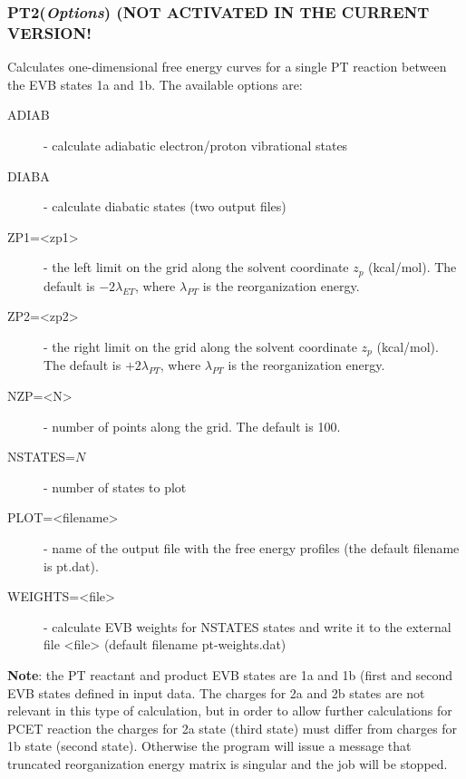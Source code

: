 \documentclass[oneside,11pt,openany]{book}
\newcommand{\tw}{\ttfamily}
\begin{document}
\subsubsection*{PT2({\it Options}) ({\bf NOT ACTIVATED IN THE CURRENT VERSION!}}
%
Calculates one-dimensional free energy curves for a single PT reaction
between the EVB states 1a and 1b. The available options are:
\begin{description}

\item[{\tw ADIAB}] - calculate adiabatic electron/proton vibrational
                     states

\item[{\tw DIABA}] - calculate diabatic states (two output files)

\item[{\tw ZP1=<zp1>}] - the left limit on the grid along the solvent
            coordinate $z_p$ (kcal/mol). The default is
            $-2\lambda_{ET}$, where $\lambda_{PT}$ is the
            reorganization energy.

\item[{\tw ZP2=<zp2>}] - the right limit on the grid along the solvent
            coordinate $z_p$ (kcal/mol). The default is
            $+2\lambda_{PT}$, where $\lambda_{PT}$ is the
            reorganization energy.

\item[{\tw NZP=<N>}] - number of points along the grid. The default is 100.

\item[{\tw NSTATES=$N$}] - number of states to plot

\item[{\tw PLOT=<filename>}] - name of the output file with the free energy
                  profiles (the default filename is {\tw pt.dat}).

\item[{\tw WEIGHTS=<file>}] - calculate EVB weights for {\tw NSTATES} states
                              and write it to the external file {\tw <file>}
                              (default filename {\tw pt-weights.dat})

\end{description}

{\bf Note}: the PT reactant and product EVB states are 1a and 1b
(first and second EVB states defined in input data. The charges for
2a and 2b states are not relevant in this type of calculation,
but in order to allow further calculations for PCET reaction
the charges for 2a state (third state) must differ from charges
for 1b state (second state). Otherwise the program will issue
a message that truncated reorganization energy matrix is singular
and the job will be stopped.
\end{document}
